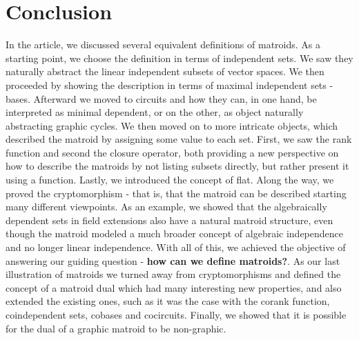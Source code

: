\newpage
\section{Conclusion}
In the article, we discussed several equivalent definitions of matroids. As a starting point, we choose the definition in terms of independent sets. We saw they naturally abstract the linear independent subsets of vector spaces. We then proceeded by showing the description in terms of maximal independent sets - bases. Afterward we moved to circuits and how they can, in one hand, be interpreted as minimal dependent, or on the other, as object naturally abstracting graphic cycles. We then moved on to more intricate objects, which described the matroid by assigning some value to each set. First, we saw the rank function and second the closure operator, both providing a new perspective on how to describe the matroids by not listing subsets directly, but rather present it using a function. Lastly, we introduced the concept of flat. Along the way, we proved the cryptomorphism - that is, that the matroid can be described starting many different viewpoints. As an example, we showed that the algebraically dependent sets in field extensions also have a natural matroid structure, even though the matroid modeled a much broader concept of algebraic independence and no longer linear independence. With all of this, we achieved the objective of answering our guiding question - \textbf{how can we define matroids?}. As our last illustration of matroids we turned away from cryptomorphisms and defined the concept of a matroid dual which had many interesting new properties, and also extended the existing ones, such as it was the case with the corank function, coindependent sets, cobases and cocircuits. Finally, we showed that it is possible for the dual of a graphic matroid to be non-graphic.
